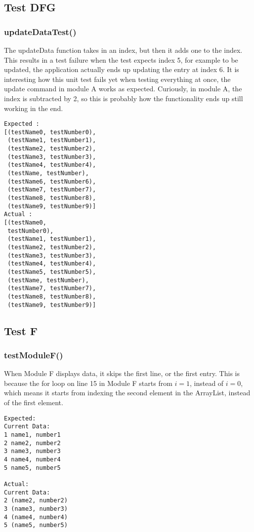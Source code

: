 \subsection{Test DFG}
\subsubsection{updateDataTest()}
The updateData function takes in an index, but then it adds one to the index.
This results in a test failure when the test expects index 5, for example to be
updated, the application actually ends up updating the entry at index 6.
It is interesting how this unit test fails yet when testing everything at once,
the update command in module A works as expected. Curiously, in module A,
the index is subtracted by 2, so this is probably how the functionality
ends up still working in the end.

\begin{verbatim}
Expected :
[(testName0, testNumber0),
 (testName1, testNumber1),
 (testName2, testNumber2),
 (testName3, testNumber3),
 (testName4, testNumber4),
 (testName, testNumber),
 (testName6, testNumber6),
 (testName7, testNumber7),
 (testName8, testNumber8),
 (testName9, testNumber9)]
Actual :
[(testName0,
 testNumber0),
 (testName1, testNumber1),
 (testName2, testNumber2),
 (testName3, testNumber3),
 (testName4, testNumber4),
 (testName5, testNumber5),
 (testName, testNumber),
 (testName7, testNumber7),
 (testName8, testNumber8),
 (testName9, testNumber9)]
\end{verbatim}

\subsection{Test F}
\subsubsection{testModuleF()}
When Module F displays data, it skips the first line, or the first entry. This
is because the for loop on line 15 in Module F starts from $i=1$, instead of
$i=0$, which means it starts from indexing the second element in the ArrayList,
instead of the first element.

\begin{verbatim}
Expected:
Current Data:
1 name1, number1
2 name2, number2
3 name3, number3
4 name4, number4
5 name5, number5

Actual:
Current Data:
2 (name2, number2)
3 (name3, number3)
4 (name4, number4)
5 (name5, number5)
\end{verbatim}

